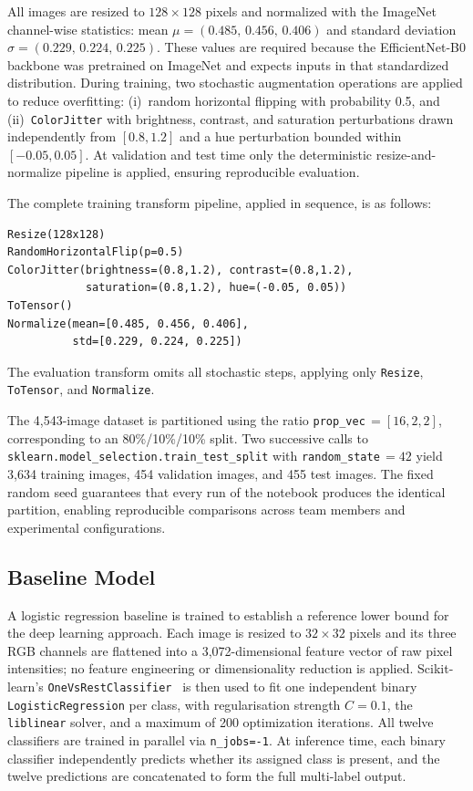 \documentclass[10pt]{article}
\begin{document}
All images are resized to $128 \times 128$ pixels and normalized with the ImageNet channel-wise
statistics: mean $\mu = (0.485,\, 0.456,\, 0.406)$ and standard deviation
$\sigma = (0.229,\, 0.224,\, 0.225)$.  These values are required because the EfficientNet-B0
backbone was pretrained on ImageNet and expects inputs in that standardized distribution.  During
training, two stochastic augmentation operations are applied to reduce overfitting:
(i)~random horizontal flipping with probability 0.5, and
(ii)~\texttt{ColorJitter} with brightness, contrast, and saturation perturbations drawn
independently from $[0.8, 1.2]$ and a hue perturbation bounded within $[-0.05, 0.05]$.
At validation and test time only the deterministic resize-and-normalize pipeline is applied,
ensuring reproducible evaluation.

The complete training transform pipeline, applied in sequence, is as follows:

\begin{verbatim}
Resize(128x128)
RandomHorizontalFlip(p=0.5)
ColorJitter(brightness=(0.8,1.2), contrast=(0.8,1.2),
            saturation=(0.8,1.2), hue=(-0.05, 0.05))
ToTensor()
Normalize(mean=[0.485, 0.456, 0.406],
          std=[0.229, 0.224, 0.225])
\end{verbatim}
The evaluation transform omits all stochastic steps, applying only \texttt{Resize},
\texttt{ToTensor}, and \texttt{Normalize}.

The 4,543-image dataset is partitioned using the ratio \texttt{prop\_vec}\,$= [16, 2, 2]$,
corresponding to an 80\%/10\%/10\% split.  Two successive calls to
\texttt{sklearn.model\_selection.train\_test\_split} with \texttt{random\_state}\,$= 42$ yield
3,634 training images, 454 validation images, and 455 test images.  The fixed random seed
guarantees that every run of the notebook produces the identical partition, enabling reproducible
comparisons across team members and experimental configurations.

\subsection*{Baseline Model}

A logistic regression baseline is trained to establish a reference lower bound for the deep
learning approach.  Each image is resized to $32 \times 32$ pixels and its three RGB channels
are flattened into a 3,072-dimensional feature vector of raw pixel intensities; no feature
engineering or dimensionality reduction is applied.  Scikit-learn's
\texttt{OneVsRestClassifier}~\cite{pedregosa2011scikit} is then used to fit one independent
binary \texttt{LogisticRegression} per class, with regularisation strength $C = 0.1$, the
\texttt{liblinear} solver, and a maximum of 200 optimization iterations.  All twelve classifiers
are trained in parallel via \texttt{n\_jobs=-1}.  At inference time, each binary classifier
independently predicts whether its assigned class is present, and the twelve predictions are
concatenated to form the full multi-label output.
\end{document}
